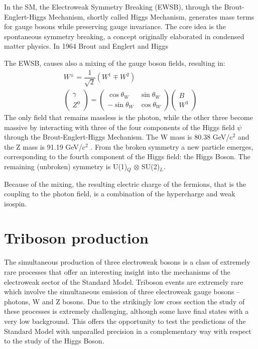 In the SM, the Electroweak Symmetry Breaking (EWSB), through the Brout-Englert-Higgs Mechanism, shortly called Higgs Mechanism, generates mass terms for gauge bosons while preserving gauge invariance.
The core idea is the spontaneous symmetry breaking, a concept originally elaborated in condensed matter physics.
In 1964 Brout and Englert \cite{PhysRevLett.13.321} and Higgs \cite{PhysRevLett.13.508, HIGGS1964132}

The EWSB, causes also a mixing of the gauge boson fields, resulting in:
\begin{equation}
\begin{split}
  W^\pm = \dfrac{1}{\sqrt{2}} \left( W^1 \mp W^2 \right)
  \\
  \begin{pmatrix} \gamma \\ Z^0 \end{pmatrix} = \begin{pmatrix} \cos\theta_W & \sin\theta_W \\ -\sin\theta_W & \cos\theta_W \end{pmatrix} \begin{pmatrix} B \\ W^3\end{pmatrix}
\end{split}
\end{equation}
The only field that remains massless is the photon, while the other three become massive by interacting with three of the four components of the Higgs field $\psi$ through the Brout-Englert-Higgs Mechanism. The W mass is 80.38 GeV/c$^2$ and the Z mass is 91.19 GeV/c$^2$ \cite{Workman:2022ynf}.
From the broken symmetry a new particle emerges, corresponding to the fourth component of the Higgs field: the Higgs Boson.
The remaining (unbroken) symmetry is U(1)$_Q$ $\otimes$ SU(2)$_L$.

Because of the mixing, the resulting electric charge of the fermions, that is the coupling to the photon field, is a combination of the hypercharge and weak isospin.

\section{Triboson production}
The simultaneous production of three electroweak bosons is a class of extremely rare processes that offer an interesting insight into the mechanisms of the electroweak sector of the Standard Model.
Triboson events are extremely rare which involve the simultaneous emission of three electroweak gauge bosons -- photons, W and Z bosons.
Due to the strikingly low cross section the study of these processes is extremely challenging,
although some have final states with a very low background.
This offers the opportunity to test the predictions of the Standard Model with unparalled precision in a complementary way with respect to the study of the Higgs Boson.

